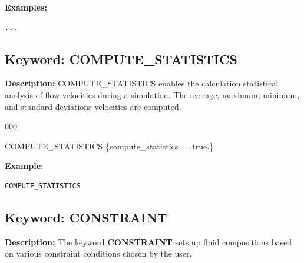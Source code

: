 \documentclass[12pt]{article}
\begin{document}
\bigskip

\noindent
{\bf Examples:}
\begin{verbatim}
...
\end{verbatim}


\newpage
\protect\hypertarget{target_stat}{}

\subsection{Keyword: COMPUTE\_STATISTICS}

\noindent
{\bf Description:}
COMPUTE\_STATISTICS enables the calculation statistical analysis of flow velocities during a simulation.  The average, maximum, minimum, and standard deviations velocities are computed.

\begin{deflist}{000}
\item [COMPUTE\_STATISTICS] \{compute\_statistics = .true.\}
\end{deflist}


\noindent
{\bf Example:}
\begin{verbatim}
COMPUTE_STATISTICS
\end{verbatim}


\newpage
\protect\hypertarget{target_constraint}{}

\subsection{Keyword: CONSTRAINT}

\noindent
{\bf Description:}
The keyword {\bf CONSTRAINT} sets up fluid compositions based on various constraint conditions chosen by the user.
\end{document}
